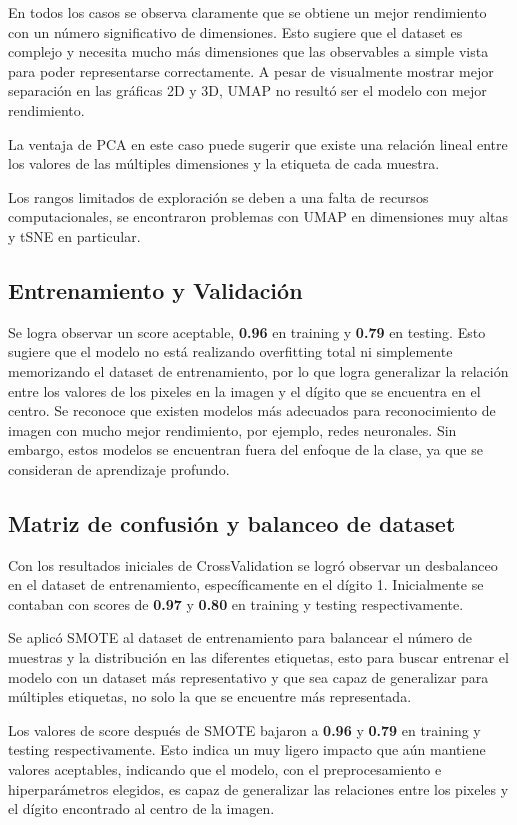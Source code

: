 \documentclass[journal]{IEEEtran}
\begin{document}
En todos los casos se observa claramente que se obtiene un mejor rendimiento con un número significativo de dimensiones. Esto sugiere que el dataset es complejo y necesita mucho más dimensiones que las observables a simple vista para poder representarse correctamente. A pesar de visualmente mostrar mejor separación en las gráficas 2D y 3D, UMAP no resultó ser el modelo con mejor rendimiento.

La ventaja de PCA en este caso puede sugerir que existe una relación lineal entre los valores de las múltiples dimensiones y la etiqueta de cada muestra. 

Los rangos limitados de exploración se deben a una falta de recursos computacionales, se encontraron problemas con UMAP en dimensiones muy altas y tSNE en particular.

\subsection{Entrenamiento y Validación}
Se logra observar un score aceptable, \textbf{0.96} en training y \textbf{0.79} en testing. Esto sugiere que el modelo no está realizando overfitting total ni simplemente memorizando el dataset de entrenamiento, por lo que logra generalizar la relación entre los valores de los pixeles en la imagen y el dígito que se encuentra en el centro. Se reconoce que existen modelos más adecuados para reconocimiento de imagen con mucho mejor rendimiento, por ejemplo, redes neuronales. Sin embargo, estos modelos se encuentran fuera del enfoque de la clase, ya que se consideran de aprendizaje profundo.

\subsection{Matriz de confusión y balanceo de dataset}
Con los resultados iniciales de CrossValidation se logró observar un desbalanceo en el dataset de entrenamiento, específicamente en el dígito 1. Inicialmente se contaban con scores de \textbf{0.97} y \textbf{0.80} en training y testing respectivamente.

Se aplicó SMOTE al dataset de entrenamiento para balancear el número de muestras y la distribución en las diferentes etiquetas, esto para buscar entrenar el modelo con un dataset más representativo y que sea capaz de generalizar para múltiples etiquetas, no solo la que se encuentre más representada.

Los valores de score después de SMOTE bajaron a \textbf{0.96} y \textbf{0.79} en training y testing respectivamente. Esto indica un muy ligero impacto que aún mantiene valores aceptables, indicando que el modelo, con el preprocesamiento e hiperparámetros elegidos, es capaz de generalizar las relaciones entre los pixeles y el dígito encontrado al centro de la imagen.
\end{document}
